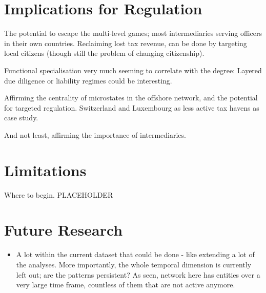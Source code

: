 \section{Implications for Regulation}

The potential to escape the multi-level games; most intermediaries serving officers in their own countries. Reclaiming lost tax revenue, can be done by targeting local citizens (though still the problem of changing citizenship).

Functional specialisation very much seeming to correlate with the degree: Layered due diligence or liability regimes could be interesting.

Affirming the centrality of microstates in the offshore network, and the potential for targeted regulation. Switzerland and Luxembourg as less active tax havens as case study.

And not least, affirming the importance of intermediaries.

\section{Limitations}

Where to begin. PLACEHOLDER

\section{Future Research}

\begin{itemize}
\item A lot within the current dataset that could be done - like extending a lot of the analyses. More importantly, the whole temporal dimension is currently left out; are the patterns persistent? As seen, network here has entities over a very large time frame, countless of them that are not active anymore.
\end{itemize}



